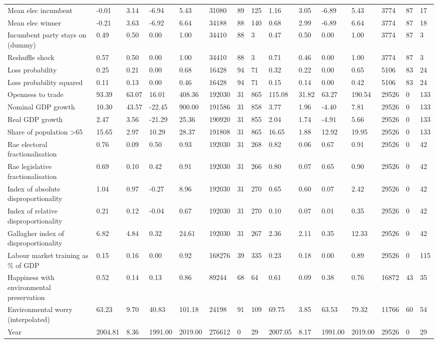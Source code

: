 \begin{longtable}{lllllllllllllll}
Mean elec incumbent & -0.01 & 3.14 & -6.94 & 5.43 & 31080 & 89 & 125 & 1.16 & 3.05 & -6.89 & 5.43 & 3774 & 87 & 17\\
Mean elec winner & -0.21 & 3.63 & -6.92 & 6.64 & 34188 & 88 & 140 & 0.68 & 2.99 & -6.89 & 6.64 & 3774 & 87 & 18\\
Incumbent party stays on (dummy) & 0.49 & 0.50 & 0.00 & 1.00 & 34410 & 88 & 3 & 0.47 & 0.50 & 0.00 & 1.00 & 3774 & 87 & 3\\
Reshuffle shock & 0.57 & 0.50 & 0.00 & 1.00 & 34410 & 88 & 3 & 0.71 & 0.46 & 0.00 & 1.00 & 3774 & 87 & 3\\
\addlinespace
Loss probability & 0.25 & 0.21 & 0.00 & 0.68 & 16428 & 94 & 71 & 0.32 & 0.22 & 0.00 & 0.65 & 5106 & 83 & 24\\
Loss probability squared & 0.11 & 0.13 & 0.00 & 0.46 & 16428 & 94 & 71 & 0.15 & 0.14 & 0.00 & 0.42 & 5106 & 83 & 24\\
Openness to trade & 93.39 & 63.07 & 16.01 & 408.36 & 192030 & 31 & 865 & 115.08 & 31.82 & 63.27 & 190.54 & 29526 & 0 & 133\\
Nominal GDP growth & 10.30 & 43.57 & -22.45 & 900.00 & 191586 & 31 & 858 & 3.77 & 1.96 & -4.40 & 7.81 & 29526 & 0 & 133\\
Real GDP growth & 2.47 & 3.56 & -21.29 & 25.36 & 190920 & 31 & 855 & 2.04 & 1.74 & -4.91 & 5.66 & 29526 & 0 & 133\\
\addlinespace
Share of population >65 & 15.65 & 2.97 & 10.29 & 28.37 & 191808 & 31 & 865 & 16.65 & 1.88 & 12.92 & 19.95 & 29526 & 0 & 133\\
Rae electoral fractionalisation & 0.76 & 0.09 & 0.50 & 0.93 & 192030 & 31 & 268 & 0.82 & 0.06 & 0.67 & 0.91 & 29526 & 0 & 42\\
Rae legislative fractionalisation & 0.69 & 0.10 & 0.42 & 0.91 & 192030 & 31 & 266 & 0.80 & 0.07 & 0.65 & 0.90 & 29526 & 0 & 42\\
Index of absolute disproportionality & 1.04 & 0.97 & -0.27 & 8.96 & 192030 & 31 & 270 & 0.65 & 0.60 & 0.07 & 2.42 & 29526 & 0 & 42\\
Index of relative disproportionality & 0.21 & 0.12 & -0.04 & 0.67 & 192030 & 31 & 270 & 0.10 & 0.07 & 0.01 & 0.35 & 29526 & 0 & 42\\
\addlinespace
Gallagher index of disproportionality & 6.82 & 4.84 & 0.32 & 24.61 & 192030 & 31 & 267 & 2.36 & 2.11 & 0.35 & 12.33 & 29526 & 0 & 42\\
Labour market training as \% of GDP & 0.15 & 0.16 & 0.00 & 0.92 & 168276 & 39 & 335 & 0.23 & 0.18 & 0.00 & 0.89 & 29526 & 0 & 115\\
Happiness with environmental preservation & 0.52 & 0.14 & 0.13 & 0.86 & 89244 & 68 & 64 & 0.61 & 0.09 & 0.38 & 0.76 & 16872 & 43 & 35\\
Environmental worry (interpolated) & 63.23 & 9.70 & 40.83 & 101.18 & 24198 & 91 & 109 & 69.75 & 3.85 & 63.53 & 79.32 & 11766 & 60 & 54\\
Year & 2004.81 & 8.36 & 1991.00 & 2019.00 & 276612 & 0 & 29 & 2007.05 & 8.17 & 1991.00 & 2019.00 & 29526 & 0 & 29\\
\bottomrule
\end{longtable}
